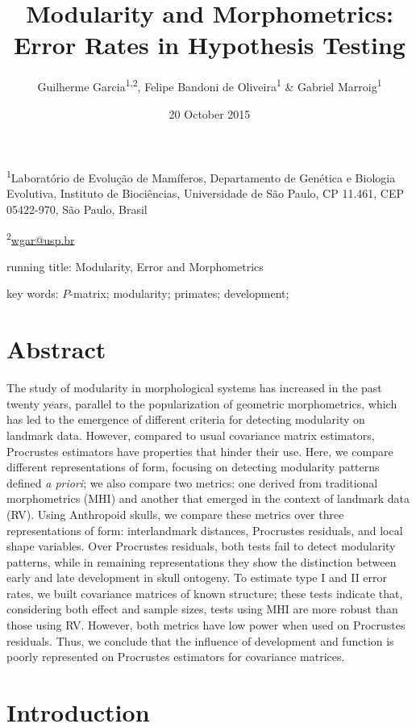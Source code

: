 \documentclass[12pt,]{article}
\title{Modularity and Morphometrics: Error Rates in Hypothesis Testing}
\author{Guilherme Garcia\textsuperscript{1,2}, Felipe Bandoni de
Oliveira\textsuperscript{1} \& Gabriel Marroig\textsuperscript{1}}
\date{20 October 2015}
\begin{document}
\maketitle


\linenumbers
\modulolinenumbers[2]

\onehalfspacing

\textsuperscript{1}Laboratório de Evolução de Mamíferos, Departamento de
Genética e Biologia Evolutiva, Instituto de Biociências, Universidade de
São Paulo, CP 11.461, CEP 05422-970, São Paulo, Brasil

\textsuperscript{2}\href{mailto:wgar@usp.br}{wgar@usp.br}

running title: Modularity, Error and Morphometrics

key words: $P$-matrix; modularity; primates; development;

\section{Abstract}\label{abstract}

The study of modularity in morphological systems has increased in the
past twenty years, parallel to the popularization of geometric
morphometrics, which has led to the emergence of different criteria for
detecting modularity on landmark data. However, compared to usual
covariance matrix estimators, Procrustes estimators have properties that
hinder their use. Here, we compare different representations of form,
focusing on detecting modularity patterns defined \emph{a priori}; we
also compare two metrics: one derived from traditional morphometrics
(MHI) and another that emerged in the context of landmark data (RV).
Using Anthropoid skulls, we compare these metrics over three
representations of form: interlandmark distances, Procrustes residuals,
and local shape variables. Over Procrustes residuals, both tests fail to
detect modularity patterns, while in remaining representations they show
the distinction between early and late development in skull ontogeny. To
estimate type I and II error rates, we built covariance matrices of
known structure; these tests indicate that, considering both effect and
sample sizes, tests using MHI are more robust than those using RV.
However, both metrics have low power when used on Procrustes residuals.
Thus, we conclude that the influence of development and function is
poorly represented on Procrustes estimators for covariance matrices.

\section{Introduction}\label{introduction}
\end{document}
